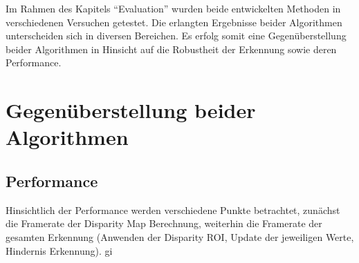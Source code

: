 Im Rahmen des Kapitels \enquote{Evaluation} wurden beide entwickelten Methoden in verschiedenen Versuchen getestet. Die erlangten Ergebnisse beider Algorithmen unterscheiden sich in diversen Bereichen. Es erfolg somit eine Gegenüberstellung beider Algorithmen in Hinsicht auf die Robustheit der Erkennung sowie deren Performance.







% 

\section{Gegenüberstellung beider Algorithmen}
\label{sec:gegenueberstellung}

\subsection{Performance}
\label{subsec:discussion_performance}

Hinsichtlich der Performance werden verschiedene Punkte betrachtet, zunächst die Framerate der Disparity Map Berechnung, weiterhin die Framerate der gesamten Erkennung (Anwenden der Disparity ROI, Update der jeweiligen Werte, Hindernis Erkennung). gi

    

